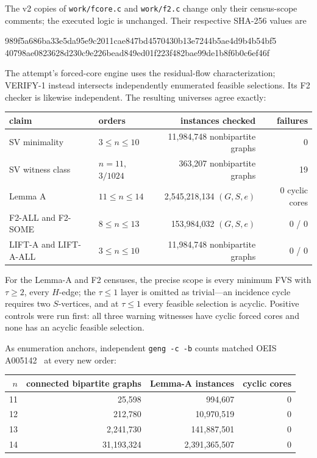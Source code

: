 \documentclass[11pt]{article}
\theoremstyle{plain}
\theoremstyle{definition}
\begin{document}
The v2 copies of \texttt{work/fcore.c} and \texttt{work/f2.c} change only their
census-scope comments; the executed logic is unchanged.  Their respective
SHA-256 values are
\begin{center}
\scriptsize\ttfamily
989f5a686ba33e5da95e9c2011cae847bd4570430b13e7244b5ae4d9b4b54bf5\\
40798ae0823628d230c9e226bead849ed01f223f482bae99de1b8f6b0c6ef46f
\end{center}

The attempt's forced-core engine uses the residual-flow characterization;
VERIFY-1 instead intersects independently enumerated feasible selections.  Its
F2 checker is likewise independent.  The resulting universes agree exactly:

\begin{center}
\begin{tabular}{l|l|r|r}
claim & orders & instances checked & failures\\
\hline
SV minimality & $3\le n\le10$ & 11,984,748 nonbipartite graphs & 0\\
SV witness class & $n=11$, $3/1024$ & 363,207 nonbipartite graphs & 19\\
Lemma A & $11\le n\le14$ & 2,545,218,134 $(G,S,e)$ & 0 cyclic cores\\
F2-ALL and F2-SOME & $8\le n\le13$ & 153,984,032 $(G,S,e)$ & 0 / 0\\
LIFT-A and LIFT-A-ALL & $3\le n\le10$ & 11,984,748 nonbipartite graphs & 0 / 0
\end{tabular}
\end{center}

For the Lemma-A and F2 censuses, the precise scope is every minimum FVS with
$\tau\ge2$, every $H$-edge; the $\tau\le1$ layer is omitted as trivial---an
incidence cycle requires two $S$-vertices, and at $\tau\le1$ every feasible
selection is acyclic.  Positive controls were run first: all three warning
witnesses have cyclic forced cores and none has an acyclic feasible selection.

As enumeration anchors, independent \texttt{geng -c -b} counts matched OEIS
A005142~\cite{OEIS} at every new order:

\begin{center}
\begin{tabular}{r|r|r|r}
$n$ & connected bipartite graphs & Lemma-A instances & cyclic cores\\
\hline
11 & 25,598 & 994,607 & 0\\
12 & 212,780 & 10,970,519 & 0\\
13 & 2,241,730 & 141,887,501 & 0\\
14 & 31,193,324 & 2,391,365,507 & 0
\end{tabular}
\end{center}
\end{document}
